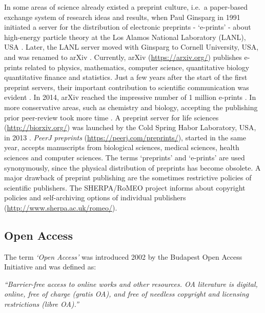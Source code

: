 \documentclass[10pt,fleqn]{wlpeerj}
\begin{document}
In
some
areas
of
science
already
existed
a
preprint
culture,
i.e.~a
paper-based
exchange
system
of
research
ideas
and
results,
when
Paul
Ginsparg
in
1991
initiated
a
server
for
the
distribution
of
electronic
preprints
-
`e-prints'
-
about
high-energy
particle
theory
at
the
Los
Alamos
National
Laboratory
(LANL),
USA
\citep{ginsparg_first_1994}.
Later,
the
LANL
server
moved
with
Ginsparg
to
Cornell
University,
USA,
and
was
renamed
to
arXiv
\citep{butler_alamos_2001}.
Currently,
arXiv
(\url{https://arxiv.org/})
publishes
e-prints
related
to
physics,
mathematics,
computer
science,
quantitative
biology
quantitative
finance
and
statistics.
Just
a few
years
after
the
start
of
the
first
preprint
servers,
their
important
contribution
to
scientific
communication
was
evident
\citep{ginsparg_first_1994, youngen_citation_1998, brown_e-volution_2001}.
In
2014,
arXiv
reached
the
impressive
number
of 1
million
e-prints
\citep{van_noorden_arxiv_2014}.
In
more
conservative
areas,
such
as
chemistry
and
biology,
accepting
the
publishing
prior
peer-review
took
more
time
\citep{brown_role_2003}.
A
preprint
server
for
life
sciences
(\url{http://biorxiv.org/})
was
launched
by
the
Cold
Spring
Habor
Laboratory,
USA,
in
2013
\citep{callaway_preprints_2013}.
\emph{PeerJ
preprints}
(\url{https://peerj.com/preprints/}),
started
in
the
same
year,
accepts
manuscripts
from
biological
sciences,
medical
sciences,
health
sciences
and
computer
sciences.
The
terms
`preprints'
and
`e-prints'
are
used
synonymously,
since
the
physical
distribution
of
preprints
has
become
obsolete.
A
major
drawback
of
preprint
publishing
are
the
sometimes
restrictive
policies
of
scientific
publishers.
The
SHERPA/RoMEO
project
informs
about
copyright
policies
and
self-archiving
options
of
individual
publishers
(\url{http://www.sherpa.ac.uk/romeo/}).

\subsection{Open
Access}\label{open-access}

The
term
\emph{`Open
Access'}
was
introduced
2002
by
the
Budapest
Open
Access
Initiative
and
was
defined
as:

\emph{``Barrier-free
access
to
online
works
and
other
resources.
OA
literature
is
digital,
online,
free
of
charge
(gratis
OA),
and
free
of
needless
copyright
and
licensing
restrictions
(libre
OA).''}
\citep{suber_open_2012}
\end{document}
